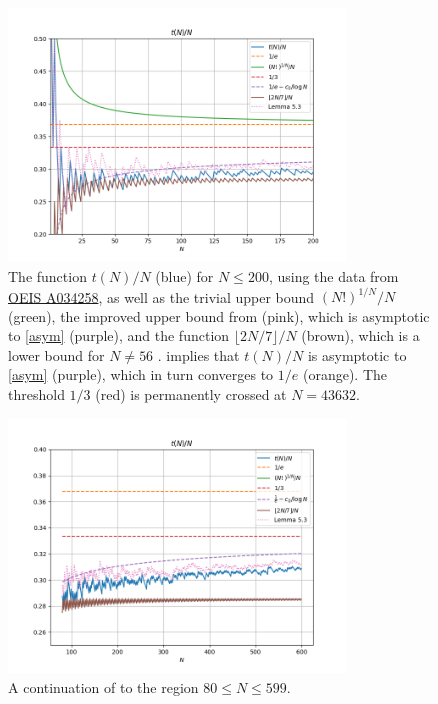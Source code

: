 \documentclass[12pt,a4paper,reqno]{amsart}
\numberwithin{equation}{section}
\theoremstyle{plain}
\theoremstyle{definition}
\begin{document}
\begin{figure}
  \centering
  \includegraphics[width=0.8\textwidth]{newplot_200.png}
  \caption{The function $t(N)/N$ (blue) for $N \leq 200$, using the data from \href{https://oeis.org/A034258}{OEIS A034258}, as well as the trivial upper bound $(N!)^{1/N}/N$ (green), the improved upper bound from  (pink), which is asymptotic to \eqref{asym} (purple), and the function $\lfloor 2N/7 \rfloor/N$ (brown), which is a lower bound for $N \neq 56$ \cite{guy}.   implies that $t(N)/N$ is asymptotic to \eqref{asym} (purple), which in turn converges to $1/e$ (orange).  The threshold $1/3$ (red) is permanently crossed at $N=43632$. 
  }\label{fig1}
  \end{figure}
  
  \begin{figure}
    \centering
    \includegraphics[width=0.8\textwidth]{newplot_600_all.png}
    \caption{A continuation of  to the region $80 \leq N \leq 599$. }\label{fig1-alt}
  \end{figure}
  
\end{document}
